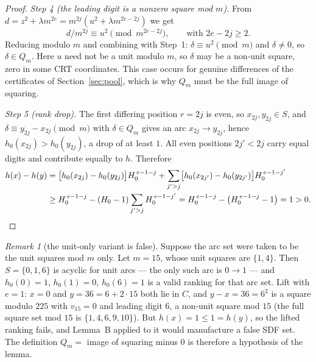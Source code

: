 \documentclass[11pt]{amsart}
\theoremstyle{plain}
\theoremstyle{remark}
\newtheorem{remark}{Remark}
\begin{document}
\begin{proof}
\emph{Step 4 (the leading digit is a nonzero square mod $m$).}
From $d = z^2 + \lambda m^{2e} = m^{2j}(u^2 + \lambda m^{2e-2j})$ we get
\[
d/m^{2j} \equiv u^2 \pmod{m^{2e-2j}}, \qquad \text{with } 2e - 2j \ge 2.
\]
Reducing modulo $m$ and combining with Step~1: $\delta \equiv u^2 \pmod m$
and $\delta \ne 0$, so $\delta \in Q_m$. Here $u$ need not be a unit modulo
$m$, so $\delta$ may be a non-unit square, zero in some CRT coordinates.
This case occurs for genuine differences of the certificates of
Section~\ref{sec:pool}, which is why $Q_m$ must be the full image of
squaring.

\emph{Step 5 (rank drop).}
The first differing position $r = 2j$ is even, so $x_{2j}, y_{2j} \in S$,
and $\delta \equiv y_{2j} - x_{2j} \pmod m$ with $\delta \in Q_m$ gives an
arc $x_{2j} \to y_{2j}$, hence $h_0(x_{2j}) > h_0(y_{2j})$, a drop of at
least $1$. All even positions $2j' < 2j$ carry equal digits and contribute
equally to $h$. Therefore
\begin{align*}
h(x) - h(y)
&= \bigl[h_0(x_{2j}) - h_0(y_{2j})\bigr] H_0^{\,e-1-j}
 + \sum_{j' > j} \bigl[h_0(x_{2j'}) - h_0(y_{2j'})\bigr] H_0^{\,e-1-j'} \\
&\ge H_0^{\,e-1-j} - (H_0 - 1) \sum_{j' > j} H_0^{\,e-1-j'}
 = H_0^{\,e-1-j} - \bigl(H_0^{\,e-1-j} - 1\bigr) = 1 > 0. \qedhere
\end{align*}
\end{proof}

\begin{remark}[the unit-only variant is false]\label{rem:units}
Suppose the arc set were taken to be the unit squares mod $m$ only. Let
$m = 15$, whose unit squares are $\{1, 4\}$. Then $S = \{0, 1, 6\}$ is
acyclic for unit arcs --- the only such arc is $0 \to 1$ --- and
$h_0(0) = 1$, $h_0(1) = 0$, $h_0(6) = 1$ is a valid ranking for that arc
set. Lift with $e = 1$: $x = 0$ and $y = 36 = 6 + 2 \cdot 15$ both lie in
$C$, and $y - x = 36 = 6^2$ is a square modulo $225$ with $v_{15} = 0$ and
leading digit $6$, a non-unit square mod $15$ (the full square set mod $15$
is $\{1, 4, 6, 9, 10\}$). But $h(x) = 1 \le 1 = h(y)$, so the lifted
ranking fails, and Lemma~B applied to it would manufacture a false SDF set.
The definition $Q_m = $ image of squaring minus $0$ is therefore a
hypothesis of the lemma.
\end{remark}
\end{document}

